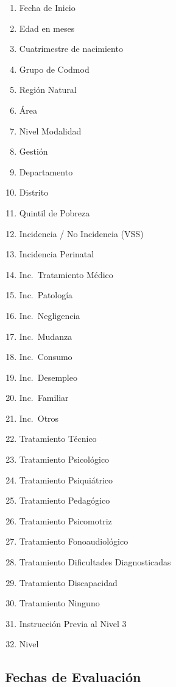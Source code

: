 \documentclass[
]{article}
\providecommand{\tightlist}{%
  \setlength{\itemsep}{0pt}\setlength{\parskip}{0pt}}
\begin{document}
\begin{enumerate}
\def\labelenumi{\arabic{enumi}.}
\tightlist
\item
  Fecha de Inicio
\item
  Edad en meses
\item
  Cuatrimestre de nacimiento
\item
  Grupo de Codmod
\item
  Región Natural
\item
  Área
\item
  Nivel Modalidad
\item
  Gestión
\item
  Departamento
\item
  Distrito
\item
  Quintil de Pobreza
\item
  Incidencia / No Incidencia (VSS)
\item
  Incidencia Perinatal
\item
  Inc.~Tratamiento Médico
\item
  Inc.~Patología
\item
  Inc.~Negligencia
\item
  Inc.~Mudanza
\item
  Inc.~Consumo
\item
  Inc.~Desempleo
\item
  Inc.~Familiar
\item
  Inc.~Otros
\item
  Tratamiento Técnico
\item
  Tratamiento Psicológico
\item
  Tratamiento Psiquiátrico
\item
  Tratamiento Pedagógico
\item
  Tratamiento Psicomotriz
\item
  Tratamiento Fonoaudiológico
\item
  Tratamiento Dificultades Diagnosticadas
\item
  Tratamiento Discapacidad
\item
  Tratamiento Ninguno
\item
  Instrucción Previa al Nivel 3
\item
  Nivel
\end{enumerate}

\subsection{Fechas de Evaluación}\label{fechas-de-evaluaciuxf3n}
\end{document}
